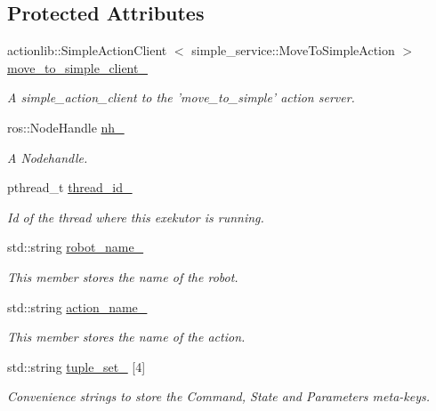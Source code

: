 \subsection*{\-Protected \-Attributes}
\begin{DoxyCompactItemize}
\item 
actionlib\-::\-Simple\-Action\-Client\*
$<$ simple\-\_\-service\-::\-Move\-To\-Simple\-Action $>$ \hyperlink{classexekutor_1_1MoveToSimpleExekutor_ae1df451b6050e7e128a4a50211c25c4b}{move\-\_\-to\-\_\-simple\-\_\-client\-\_\-}
\begin{DoxyCompactList}\small\item\em \-A simple\-\_\-action\-\_\-client to the 'move\-\_\-to\-\_\-simple' action server. \end{DoxyCompactList}\item 
ros\-::\-Node\-Handle \hyperlink{classexekutor_1_1ActionExekutor_a1f0541608c4f27f3c72ab22b1874c882}{nh\-\_\-}
\begin{DoxyCompactList}\small\item\em \-A \-Nodehandle. \end{DoxyCompactList}\item 
pthread\-\_\-t \hyperlink{classexekutor_1_1ActionExekutor_a8d7e748c6d705da31eea62af6723ebca}{thread\-\_\-id\-\_\-}
\begin{DoxyCompactList}\small\item\em \-Id of the thread where this exekutor is running. \end{DoxyCompactList}\item 
std\-::string \hyperlink{classexekutor_1_1ActionExekutor_af165894bbbbabd62c17be857be095936}{robot\-\_\-name\-\_\-}
\begin{DoxyCompactList}\small\item\em \-This member stores the name of the robot. \end{DoxyCompactList}\item 
std\-::string \hyperlink{classexekutor_1_1ActionExekutor_ad0ab1bb7a2575962ee5fc9e2150c5d50}{action\-\_\-name\-\_\-}
\begin{DoxyCompactList}\small\item\em \-This member stores the name of the action. \end{DoxyCompactList}\item 
std\-::string \hyperlink{classexekutor_1_1ActionExekutor_a22f5cde3fe83eb147ec50c2d760b2d1f}{tuple\-\_\-set\-\_\-} \mbox{[}4\mbox{]}
\begin{DoxyCompactList}\small\item\em \-Convenience strings to store the \-Command, \-State and \-Parameters meta-\/keys. \end{DoxyCompactList}\end{DoxyCompactItemize}
